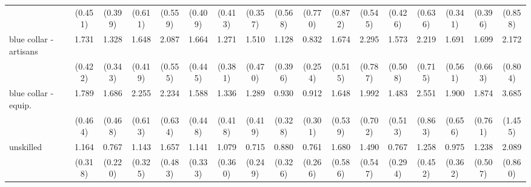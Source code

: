 {\begin{tabular}{l*{16}{c}}
                    &     (0.451)         &     (0.399)         &     (0.611)         &     (0.559)         &     (0.409)         &     (0.413)         &     (0.357)         &     (0.568)         &     (0.770)         &     (0.872)         &     (0.545)         &     (0.426)         &     (0.636)         &     (0.341)         &     (0.396)         &     (0.858)         \\
[1em]
blue collar - artisans&       1.731\sym{*}  &       1.328         &       1.648\sym{*}  &       2.087\sym{**} &       1.664         &       1.271         &       1.510         &       1.128         &       0.832         &       1.674         &       2.295\sym{*}  &       1.573         &       2.219\sym{*}  &       1.691         &       1.699         &       2.172\sym{*}  \\
                    &     (0.422)         &     (0.343)         &     (0.419)         &     (0.555)         &     (0.445)         &     (0.381)         &     (0.470)         &     (0.396)         &     (0.254)         &     (0.515)         &     (0.787)         &     (0.508)         &     (0.715)         &     (0.561)         &     (0.663)         &     (0.804)         \\
[1em]
blue collar - equip.&       1.789\sym{*}  &       1.686         &       2.255\sym{**} &       2.234\sym{**} &       1.588         &       1.336         &       1.289         &       0.930         &       0.912         &       1.648         &       1.992         &       1.483         &       2.551\sym{**} &       1.900         &       1.874         &       3.685\sym{***}\\
                    &     (0.464)         &     (0.468)         &     (0.613)         &     (0.634)         &     (0.448)         &     (0.418)         &     (0.419)         &     (0.328)         &     (0.301)         &     (0.539)         &     (0.702)         &     (0.513)         &     (0.863)         &     (0.656)         &     (0.761)         &     (1.455)         \\
[1em]
unskilled           &       1.164         &       0.767         &       1.143         &       1.657         &       1.141         &       1.079         &       0.715         &       0.880         &       0.761         &       1.680         &       1.490         &       0.767         &       1.258         &       0.975         &       1.238         &       2.089         \\
                    &     (0.318)         &     (0.220)         &     (0.325)         &     (0.483)         &     (0.333)         &     (0.360)         &     (0.249)         &     (0.326)         &     (0.266)         &     (0.586)         &     (0.547)         &     (0.294)         &     (0.452)         &     (0.362)         &     (0.507)         &     (0.860)         \\

\end{tabular}}
